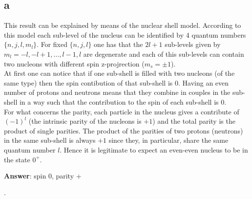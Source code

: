 \subsection*{a}
This result can be explained by means of the nuclear shell model. According to this model each sub-level of the nucleus can be identified by 4 quantum numbers $\{n, j, l, m_l\}$. For fixed $\{n, j, l\}$ 
one has that the $2l+1$ sub-levels given by $m_l = -l, -l+1, \dots, l-1, l$ are degenerate and each of this sub-levels can contain two nucleons with different spin z-projrection ($m_s = \pm 1$). \\
At first one can notice that if one sub-shell is filled with two nucleons (of the same type) then the spin contibution of that sub-shell is 0. Having an even number of protons and neutrons means that 
they combine in couples in the sub-shell in a way such that the contribution to the spin of each sub-shell is 0. \\
For what concerns the parity, each particle in the nucleus gives a contribute of $(-1)^l$ (the intrinsic parity of the nucleons is $+1$) and the total parity is the product of single parities. 
The product of the parities of two protons (neutrons) in the same sub-shell is always $+1$ since they, in particular, share the same quantum number $l$. Hence it is legitimate to expect an even-even nucleus
to be in the state $0^+$.
\centerline{\textbf{Answer}: spin $0$, parity $+$}.